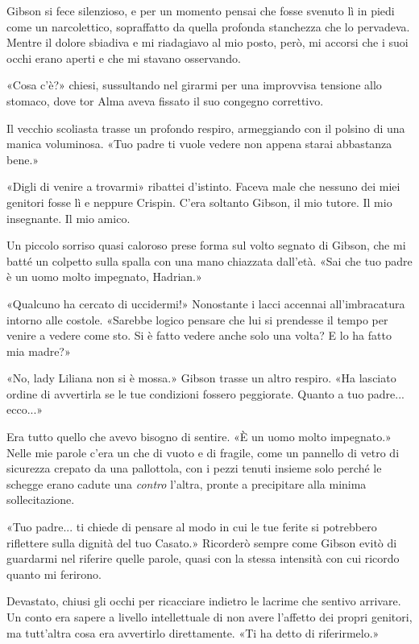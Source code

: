 Gibson si fece silenzioso, e per un momento pensai che fosse svenuto lì
in piedi come un narcolettico, sopraffatto da quella profonda stanchezza
che lo pervadeva. Mentre il dolore sbiadiva e mi riadagiavo al mio
posto, però, mi accorsi che i suoi occhi erano aperti e che mi stavano
osservando.

«Cosa c'è?» chiesi, sussultando nel girarmi per una improvvisa tensione
allo stomaco, dove tor Alma aveva fissato il suo congegno correttivo.

Il vecchio scoliasta trasse un profondo respiro, armeggiando con il
polsino di una manica voluminosa. «Tuo padre ti vuole vedere non appena
starai abbastanza bene.»

«Digli di venire a trovarmi» ribattei d'istinto. Faceva male che nessuno
dei miei genitori fosse lì e neppure Crispin. C'era soltanto Gibson, il
mio tutore. Il mio insegnante. Il mio amico.

Un piccolo sorriso quasi caloroso prese forma sul volto segnato di
Gibson, che mi batté un colpetto sulla spalla con una mano chiazzata
dall'età. «Sai che tuo padre è un uomo molto impegnato, Hadrian.»

«Qualcuno ha cercato di uccidermi!» Nonostante i lacci accennai
all'imbracatura intorno alle costole. «Sarebbe logico pensare che lui si
prendesse il tempo per venire a vedere come sto. Si è fatto vedere anche
solo una volta? E lo ha fatto mia madre?»

«No, lady Liliana non si è mossa.» Gibson trasse un altro respiro. «Ha
lasciato ordine di avvertirla se le tue condizioni fossero peggiorate.
Quanto a tuo padre... ecco...»

Era tutto quello che avevo bisogno di sentire. «È un uomo molto
impegnato.» Nelle mie parole c'era un che di vuoto e di fragile, come un
pannello di vetro di sicurezza crepato da una pallottola, con i pezzi
tenuti insieme solo perché le schegge erano cadute una \emph{contro}
l'altra, pronte a precipitare alla minima sollecitazione.

«Tuo padre... ti chiede di pensare al modo in cui le tue ferite si
potrebbero riflettere sulla dignità del tuo Casato.» Ricorderò sempre
come Gibson evitò di guardarmi nel riferire quelle parole, quasi con la
stessa intensità con cui ricordo quanto mi ferirono.

Devastato, chiusi gli occhi per ricacciare indietro le lacrime che
sentivo arrivare. Un conto era sapere a livello intellettuale di non
avere l'affetto dei propri genitori, ma tutt'altra cosa era avvertirlo
direttamente. «Ti ha detto di riferirmelo.»

